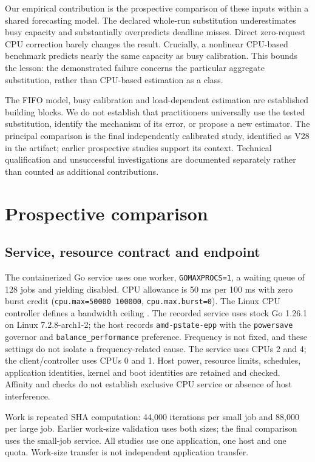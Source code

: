 \documentclass[11pt,a4paper]{article}
\begin{document}
Our empirical contribution is the prospective comparison of these inputs
within a shared forecasting model. The declared whole-run substitution
underestimates busy capacity and substantially overpredicts deadline misses.
Direct zero-request CPU correction barely changes the result. Crucially, a
nonlinear CPU-based benchmark predicts nearly the same capacity as busy
calibration. This bounds the lesson: the demonstrated failure concerns the
particular aggregate substitution, rather than CPU-based estimation as a class.

The FIFO model, busy calibration and load-dependent estimation are established
building blocks. We do not establish that practitioners universally use the
tested substitution, identify the mechanism of its error, or propose a new
estimator. The principal comparison is the final independently calibrated
study, identified as V28 in the artifact; earlier prospective studies support
its context. Technical qualification and unsuccessful investigations are
documented separately rather than counted as additional contributions.

\section{Prospective comparison}

\subsection{Service, resource contract and endpoint}

The containerized Go service uses one worker, \texttt{GOMAXPROCS=1}, a waiting queue
of 128 jobs and yielding disabled. CPU allowance is 50 ms per 100 ms with
zero burst credit (\texttt{cpu.max=50000 100000}, \texttt{cpu.max.burst=0}). The Linux
CPU controller defines a bandwidth ceiling \cite{linux}. The recorded service uses
stock Go 1.26.1 on Linux 7.2.8-arch1-2; the host records \texttt{amd-pstate-epp}
with the \texttt{powersave} governor and \texttt{balance\_performance} preference. Frequency
is not fixed, and these settings do not isolate a frequency-related cause. The service uses CPUs 2 and 4; the client/controller uses
CPUs 0 and 1. Host power, resource limits, schedules, application identities,
kernel and boot identities are retained and checked. Affinity and checks do
not establish exclusive CPU service or absence of host interference.

Work is repeated SHA computation: 44,000 iterations per small job and 88,000
per large job. Earlier work-size validation uses both sizes; the final
comparison uses the small-job service. All studies use one application, one
host and one quota. Work-size transfer is not independent application transfer.
\end{document}

